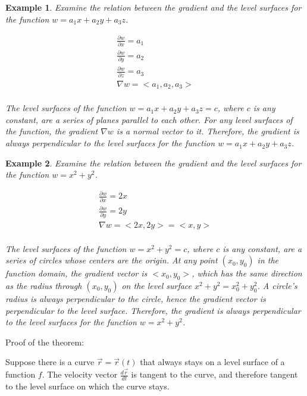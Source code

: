 \documentclass{article}
\newtheorem{example}{Example}
\begin{document}
\begin{example}
  Examine the relation between the gradient and the level surfaces for the 
  function $w = a_1x + a_2y + a_3z$.

  \begin{gather*}
    \frac{\partial w}{\partial x} = a_1 \\
    \frac{\partial w}{\partial y} = a_2 \\
    \frac{\partial w}{\partial z} = a_3 \\
    \nabla w = <a_1, a_2, a_3> \\
  \end{gather*}

  The level surfaces of the function $w = a_1x + a_2y + a_3z = c$, where $c$ is 
  any constant, are a series of planes parallel to each other. For any level 
  surfaces of the function, the gradient $\nabla w$ is a normal vector to it. 
  Therefore, the gradient is always perpendicular to the level surfaces for the 
  function $w = a_1x + a_2y + a_3z$.
\end{example}

\begin{example}
  Examine the relation between the gradient and the level surfaces for the 
  function $w = x^2 + y^2$.

  \begin{gather*}
    \frac{\partial w}{\partial x} = 2x \\
    \frac{\partial w}{\partial y} = 2y \\
    \nabla w = <2x, 2y> = <x, y> \\
  \end{gather*}

  The level surfaces of the function $w = x^2 + y^2 = c$, where $c$ is any 
  constant, are a series of circles whose centers are the origin. At any point 
  $(x_0, y_0)$ in the function domain, the gradient vector is $<x_0, y_0>$, 
  which has the same direction as the radius through $(x_0, y_0)$ on the level 
  surface $x^2 + y^2 = x_0^2 + y_0^2$. A circle's radius is always perpendicular 
  to the circle, hence the gradient vector is perpendicular to the level surface. 
  Therefore, the gradient is always perpendicular to the level surfaces for the 
  function $w = x^2 + y^2$.
\end{example}

Proof of the theorem:

Suppose there is a curve $\vec{r} = \vec{r}(t)$ that always stays on a level 
surface of a function $f$. The velocity vector $\frac{d\vec{r}}{dt}$ is tangent 
to the curve, and therefore tangent to the level surface on which the curve 
stays.
\end{document}

